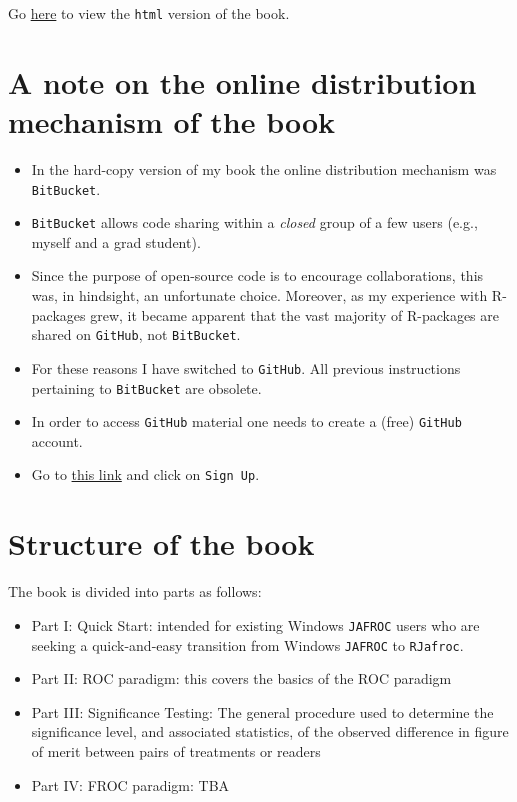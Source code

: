 \documentclass[
]{book}
\providecommand{\tightlist}{%
  \setlength{\itemsep}{0pt}\setlength{\parskip}{0pt}}
\begin{document}
Go \href{https://dpc10ster.github.io/RJafrocQuickStart/}{here} to view the \texttt{html} version of the book.

\hypertarget{a-note-on-the-online-distribution-mechanism-of-the-book}{%
\section*{A note on the online distribution mechanism of the book}\label{a-note-on-the-online-distribution-mechanism-of-the-book}}

\begin{itemize}
\tightlist
\item
  In the hard-copy version of my book \citep{chakraborty2017observer} the online distribution mechanism was \texttt{BitBucket}.
\item
  \texttt{BitBucket} allows code sharing within a \emph{closed} group of a few users (e.g., myself and a grad student).
\item
  Since the purpose of open-source code is to encourage collaborations, this was, in hindsight, an unfortunate choice. Moreover, as my experience with R-packages grew, it became apparent that the vast majority of R-packages are shared on \texttt{GitHub}, not \texttt{BitBucket}.
\item
  For these reasons I have switched to \texttt{GitHub}. All previous instructions pertaining to \texttt{BitBucket} are obsolete.
\item
  In order to access \texttt{GitHub} material one needs to create a (free) \texttt{GitHub} account.
\item
  Go to \href{https://github.com}{this link} and click on \texttt{Sign\ Up}.
\end{itemize}

\hypertarget{structure-of-the-book}{%
\section*{Structure of the book}\label{structure-of-the-book}}

The book is divided into parts as follows:

\begin{itemize}
\tightlist
\item
  Part I: Quick Start: intended for existing Windows \texttt{JAFROC} users who are seeking a quick-and-easy transition from Windows \texttt{JAFROC} to \texttt{RJafroc}.
\item
  Part II: ROC paradigm: this covers the basics of the ROC paradigm
\item
  Part III: Significance Testing: The general procedure used to determine the significance level, and associated statistics, of the observed difference in figure of merit between pairs of treatments or readers
\item
  Part IV: FROC paradigm: TBA
\end{itemize}
\end{document}
